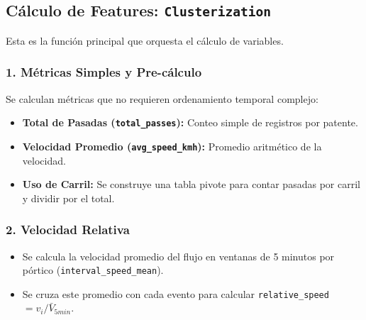\subsection{Cálculo de Features: \texttt{Clusterization}}
Esta es la función principal que orquesta el cálculo de variables.

\subsubsection{1. Métricas Simples y Pre-cálculo}
Se calculan métricas que no requieren ordenamiento temporal complejo:
\begin{itemize}
    \item \textbf{Total de Pasadas (\texttt{total\_passes}):} Conteo simple de registros por patente.
    \item \textbf{Velocidad Promedio (\texttt{avg\_speed\_kmh}):} Promedio aritmético de la velocidad.
    \item \textbf{Uso de Carril:} Se construye una tabla pivote para contar pasadas por carril y dividir por el total.
\end{itemize}

\subsubsection{2. Velocidad Relativa}
\begin{itemize}
    \item Se calcula la velocidad promedio del flujo en ventanas de 5 minutos por pórtico (\texttt{interval\_speed\_mean}).
    \item Se cruza este promedio con cada evento para calcular \texttt{relative\_speed} $= v_i / \bar{V}_{5min}$.
\end{itemize}

